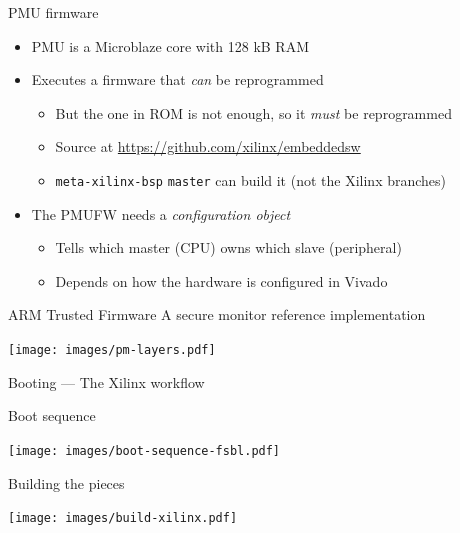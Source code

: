 \documentclass[xetex,table]{beamer}
\begin{document}
\begin{frame}{PMU firmware}
  \begin{itemize}
  \item PMU is a Microblaze core with 128 kB RAM
  \item Executes a firmware that {\em can} be reprogrammed
    \begin{itemize}
    \item But the one in ROM is not enough, so it {\em must} be
      reprogrammed
    \item Source at \url{https://github.com/xilinx/embeddedsw}
    \item {\tt meta-xilinx-bsp} {\tt master} can build it (not the
      Xilinx branches)
    \end{itemize}
  \item The PMUFW needs a {\em configuration object}
    \begin{itemize}
    \item Tells which master (CPU) owns which slave (peripheral)
    \item Depends on how the hardware is configured in Vivado
    \end{itemize}
  \end{itemize}
\end{frame}

\begin{frame}{ARM Trusted Firmware}
  A secure monitor reference implementation

   \begin{center}
    \texttt{[image: images/pm-layers.pdf]}
  \end{center}
\end{frame}

\begin{frame}[standout]
   Booting --- The Xilinx workflow
\end{frame}

\begin{frame}{Boot sequence}
  \begin{center}
    \texttt{[image: images/boot-sequence-fsbl.pdf]}
  \end{center}
\end{frame}

\begin{frame}{Building the pieces}
  \begin{center}
    \texttt{[image: images/build-xilinx.pdf]}
  \end{center}
\end{frame}
\end{document}
